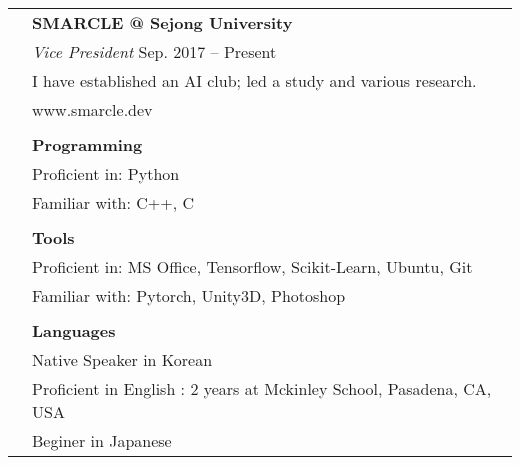 \documentclass[letterpaper, 11pt]{article}
\begin{document}
\begin{longtable}{p{1.3in}p{4.8in}}
\nohyphens{\color{Violet}{Club Activities}}
& \textbf{SMARCLE @ Sejong University} \\
& {\it Vice President} \hfill Sep. 2017 -- Present \\
& I have established an AI club; led a study and various research. \\
& www.smarcle.dev\\
& \\

{\color{Violet}{Skills}} 
& \textbf{Programming}\\
& Proficient in: Python \\
& Familiar with: C++, C \\
& \\
& \textbf{Tools}\\
& Proficient in: MS Office, Tensorflow, Scikit-Learn, Ubuntu, Git \\
& Familiar with: Pytorch, Unity3D, Photoshop \\
& \\
& \textbf{Languages} \\
& Native Speaker in Korean\\
& Proficient in English : 2 years at Mckinley School, Pasadena, CA, USA\\
& Beginer in Japanese\\


\end{longtable}
\end{document}
